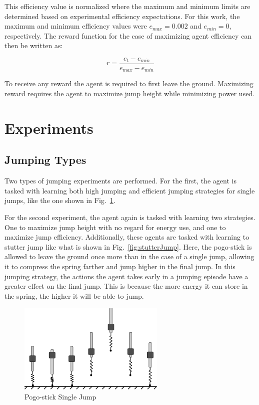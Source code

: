 \documentclass{ifacconf}
\begin{document}
      This efficiency value is normalized where the maximum and minimum limits are determined based on experimental efficiency expectations. For this work, the maximum and minimum efficiency values were $e_{max} = 0.002$ and $e_{min} = 0$, respectively. The reward function for the case of maximizing agent efficiency can then be written as:

      \begin{equation} \label{eq:rewardEfficiency}
         r = \frac{e_t - e_{min}}{e_{max} - e_{min}}
      \end{equation}

      To receive any reward the agent is required to first leave the ground. Maximizing reward requires the agent to maximize jump height while minimizing power used. 


\section{Experiments}
   \subsection{Jumping Types}

      Two types of jumping experiments are performed. For the first, the agent is tasked with learning both high jumping and efficient jumping strategies for single jumps, like the one shown in Fig.~\ref{fig:singleJump}.

      For the second experiment, the agent again is tasked with learning two strategies. One to maximize jump height with no regard for energy use, and one to maximize jump efficiency. Additionally, these agents are tasked with learning to stutter jump like what is shown in Fig.~\ref{fig:stutterJump}. Here, the pogo-stick is allowed to leave the ground once more than in the case of a single jump, allowing it to compress the spring farther and jump higher in the final jump. In this jumping strategy, the actions the agent takes early in a jumping episode have a greater effect on the final jump. This is because the more energy it can store in the spring, the higher it will be able to jump. 

      \begin{figure}[t]
         \begin{center}
            \includegraphics[width=7cm]{figures/regular_jump.pdf}    %
            \caption{Pogo-stick Single Jump} 
            \label{fig:singleJump}
         \end{center}
      \end{figure}
      
\end{document}
